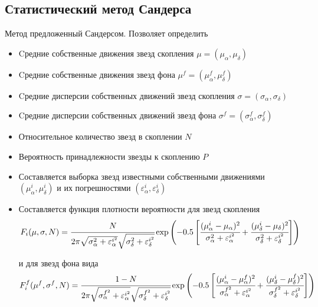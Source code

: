 \documentclass{beamer}
\begin{document}
    \subsection{Статистический метод Сандерса}
    \begin{frame}
        Метод предложенный Сандерсом\cite{Sanders}. Позволяет определить
        \begin{itemize}
            \item Cредние собственные движения звезд скопления $\mu = (\mu_\alpha, \mu_\delta)$
            \item Cредние собственные движения звезд фона $\mu^f = (\mu^f_\alpha, \mu^f_\delta)$
            \item Cредние дисперсии собственных движений звезд скопления $\sigma = (\sigma_\alpha, \sigma_\delta)$
            \item Cредние дисперсии собственных движений звезд фона $\sigma^f = (\sigma^f_\alpha, \sigma^f_\delta)$
            \item Относительное количество звезд в скоплении $N$
            \item Вероятность принадлежности звезды к скоплению $P$
        \end{itemize}
    \end{frame}
    \begin{frame}
        \begin{itemize}
            \item Составляется выборка звезд известными собственными движениями $(\mu^i_\alpha, \mu^i_\delta)$ и их погрешностями $(\varepsilon^i_\alpha, \varepsilon^i_\delta)$
            \item Составляется функция плотности вероятности для звезд скопления
            \scriptsize
            \begin{equation*}
                    F_i(\mu, \sigma, N) = \cfrac{N}{2\pi\sqrt{\sigma^{2}_\alpha + \varepsilon_\alpha^{i^2}}\sqrt{\sigma^{2}_\delta + \varepsilon_\delta^{i^2}}}\exp\left(-0.5\left[ \cfrac{(\mu^i_\alpha - \mu_\alpha)^2}{\sigma^{2}_\alpha + \varepsilon_\alpha^{i^2}} + \cfrac{(\mu^i_\delta - \mu_\delta)^2}{\sigma^{2}_\delta + \varepsilon_\delta^{i^2}} \right]\right)
            \end{equation*}

            \normalsize и для звезд фона вида
            \scriptsize
            \begin{equation*}
                    F^f_i(\mu^f, \sigma^f, N) = \cfrac{1-N}{2\pi\sqrt{\sigma^{f^2}_\alpha + \varepsilon_\alpha^{i^2}}\sqrt{\sigma^{f^2}_\delta + \varepsilon_\delta^{i^2}}}\exp\left(-0.5\left[ \cfrac{(\mu^i_\alpha - \mu^f_\alpha)^2}{\sigma^{f^2}_\alpha + \varepsilon_\alpha^{i^2}} + \cfrac{(\mu^i_\delta - \mu^f_\delta)^2}{\sigma^{f^2}_\delta + \varepsilon_\delta^{i^2}} \right]\right)
            \end{equation*}
        \end{itemize}
    \end{frame}
\end{document}
